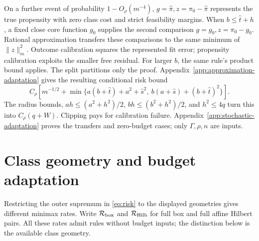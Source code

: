 \documentclass{article}
\theoremstyle{definition}
\theoremstyle{remark}
\begin{document}
On a further event of probability \(1-O_\rho(m^{-4})\),
\(g=\widehat\pi,z=\pi_0-\widehat\pi\) represents the true propensity
with zero class cost and strict feasibility margins.
When \(b\le\widehat t+h\), a fixed close core function \(g_0\) supplies
the second comparison \(g=g_0,z=\pi_0-g_0\).
Rational approximation transfers these comparisons to the same
minimum of \(\|z\|_m^2\). Outcome calibration squares the represented
fit error; propensity calibration exploits the smaller free residual.
For larger \(b\), the same rule's product bound applies.
The split partitions only the proof.
Appendix~\ref{app:approximation-adaptation} gives the resulting conditional
risk bound
\[
 C_\rho\left[m^{-1/2}+
 \min\{a(b+\widehat t)+a^2+\widehat s^2,\
        b(a+\widehat s)+(b+\widehat t)^2\}\right].
\]
The radius bounds, \(ah\le(a^2+h^2)/2\),
\(bh\le(b^2+h^2)/2\), and \(h^2\le4q\) turn this into \(C_\rho(q+W)\).
Clipping pays for calibration failure. Appendix~\ref{app:stochastic-adaptation}
proves the transfers and zero-budget cases; only \(\Gamma,\rho,n\) are inputs.

\section{Class geometry and budget adaptation}
\label{sec:adaptation}
Restricting the outer supremum in \eqref{eq:risk} to the displayed geometries gives different minimax rates. Write \(\mathcal R_{\rm box}\) and \(\mathcal R_{\rm Hilb}\) for full box and full affine Hilbert pairs. All these rates admit rules without budget inputs; the distinction below is the available class geometry.
\end{document}
